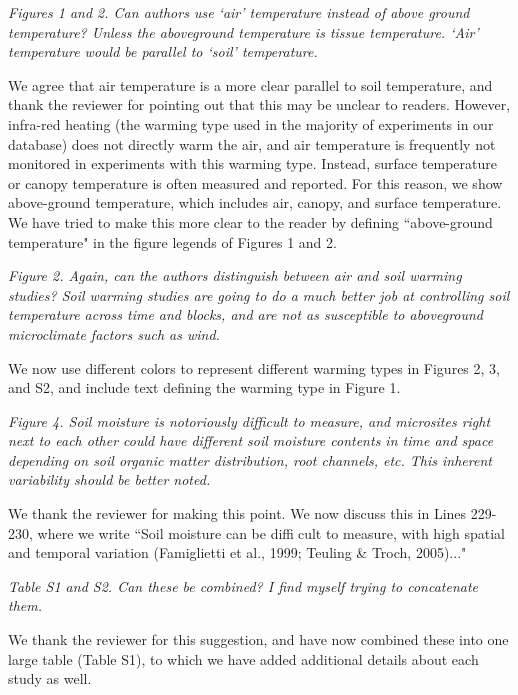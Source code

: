 \documentclass[11pt,a4paper]{letter}
\begin{document}
\begin{letter}{}
\par \emph{Figures 1 and 2. Can authors use `air' temperature instead of above ground temperature? Unless the aboveground temperature is tissue temperature.  `Air' temperature would be parallel to `soil' temperature. }
\par We agree that air temperature is a more clear parallel to soil temperature, and thank the reviewer for pointing out that this may be unclear to readers. However, infra-red heating (the warming type used in the majority of experiments in our database)  does not directly warm the air, and air temperature is frequently not monitored in experiments with this warming type. Instead, surface temperature or canopy temperature is often measured and reported. For this reason, we show above-ground temperature, which includes air, canopy, and surface temperature. We have tried to make this more clear to the reader by defining ``above-ground temperature" in the figure legends of Figures 1 and 2.

\par \emph{Figure 2.  Again, can the authors distinguish between air and soil warming studies?  Soil warming studies are going to do a much better job at controlling soil temperature across time and blocks, and are not as susceptible to aboveground microclimate factors such as wind.}
\par We now use different colors to represent different warming types in Figures 2, 3, and S2, and include text defining the warming type in Figure 1.

\par \emph{Figure 4.  Soil moisture is notoriously difficult to measure, and microsites right next to each other could have different soil moisture contents in time and space depending on soil organic matter distribution, root channels, etc.  This inherent variability should be better noted.}
\par We thank the reviewer for making this point. We now discuss this in Lines 229-230, where we write ``Soil moisture can be difficult to measure, with high spatial and temporal variation (Famiglietti et al., 1999; Teuling & Troch, 2005)..."

\par \emph{Table S1 and S2.  Can these be combined?  I find myself trying to concatenate them.}
\par We thank the reviewer for this suggestion, and have now combined these into one large table (Table S1), to which we have added additional details about each study as well.


\end{letter}
\end{document}
